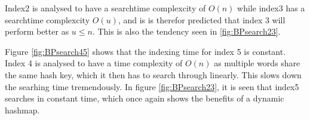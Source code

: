 Index2 is analysed to have a searchtime complexcity of $O(n)$ while index3 has a searchtime complexcity $O(u)$, and is is therefor predicted that index 3 will perform better as $u\leq n$. This is also the tendency seen in \ref{fig:BPsearch23}.

Figure \ref{fig:BPsearch45} shows that the indexing time for index 5 is constant. Index 4 is analysed to have a time complexity of $O(n)$ as multiple words share the same hash key, which it then has to search through linearly. This slows down the searhing time tremendously. In figure \ref{fig:BPsearch23}, it is seen that index5 searches in constant time, which once again shows the benefits of a dynamic hashmap.  




